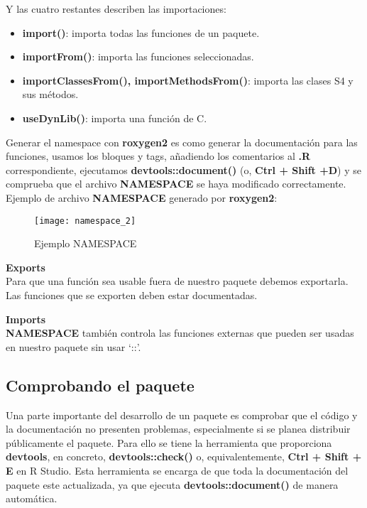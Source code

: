Y las cuatro restantes describen las importaciones:
\begin{itemize}
    \item \textbf{import()}: importa todas las funciones de un paquete.
    \item \textbf{importFrom()}: importa las funciones seleccionadas.
    \item \textbf{importClassesFrom(), importMethodsFrom()}: importa las clases S4 y sus
m\'etodos.
    \item \textbf{useDynLib()}: importa una funci\'on de C.
\end{itemize}

Generar el namespace con \textbf{roxygen2} es como generar la documentaci\'on para las funciones,
usamos los bloques y tags, a\~nadiendo los comentarios al \textbf{.R} correspondiente, ejecutamos
\textbf{devtools::document()} (o, \textbf{Ctrl + Shift +D}) y se comprueba que el archivo \textbf{NAMESPACE} se
haya modificado correctamente.\\

Ejemplo de archivo \textbf{NAMESPACE} generado por \textbf{roxygen2}:

\begin{figure}[H]
    \centering
    \texttt{[image: namespace\_2]}
    \caption{Ejemplo NAMESPACE }
    \label{fig:namespace}
\end{figure} 

\textbf{Exports}\\
Para que una funci\'on sea usable fuera de nuestro paquete debemos exportarla. Las funciones que se exporten deben estar documentadas.

\textbf{Imports}\\
\textbf{NAMESPACE} tambi\'en controla las funciones externas que pueden ser usadas en nuestro
paquete sin usar \enquote*{::}.

\subsection{Comprobando el paquete}

Una parte importante del desarrollo de un paquete es comprobar que el c\'odigo y la
documentaci\'on no presenten problemas, especialmente si se planea distribuir p\'ublicamente
el paquete. Para ello se tiene la herramienta que proporciona \textbf{devtools}, en concreto,
\textbf{devtools::check()} o, equivalentemente, \textbf{Ctrl + Shift + E} en R Studio.
Esta herramienta se encarga de que toda la documentaci\'on del paquete este actualizada, ya
que ejecuta \textbf{devtools::document()} de manera autom\'atica.

